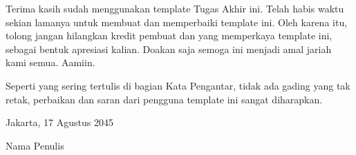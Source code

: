Terima kasih sudah menggunakan template Tugas Akhir ini. Telah habis waktu sekian lamanya untuk membuat dan memperbaiki template ini. Oleh karena itu, tolong jangan hilangkan kredit pembuat dan yang memperkaya template ini, sebagai bentuk apresiasi kalian. Doakan saja semoga ini menjadi amal jariah kami semua. Aamiin.

Seperti yang sering tertulis di bagian Kata Pengantar, tidak ada gading yang tak retak, perbaikan dan saran dari pengguna template ini sangat diharapkan.

	\vskip 3cm
	\hspace{10cm} Jakarta, 17 Agustus 2045 \par
	\vskip 3cm
	\hspace{10cm} Nama Penulis